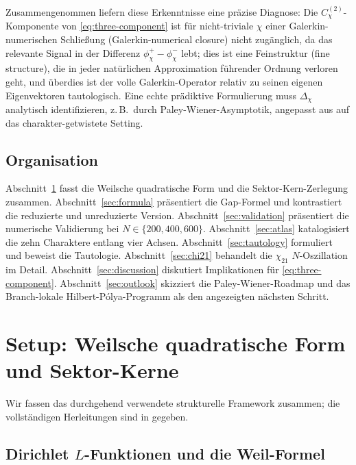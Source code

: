 \documentclass[10pt,twocolumn]{article}
\theoremstyle{definition}
\theoremstyle{remark}
\newcommand{\chifn}{\chi}
\newcommand{\Deltachi}{\Delta_{\chifn}}
\begin{document}
Zusammengenommen liefern diese Erkenntnisse eine präzise Diagnose: Die
$C^{(2)}_{\chifn}$-Komponente von \eqref{eq:three-component} ist für
nicht-triviale $\chi$ einer Galerkin-numerischen Schließung (Galerkin-numerical closure)
nicht zugänglich, da das relevante Signal in der Differenz
$\phi^+_{\chifn}-\phi^-_{\chifn}$ lebt; dies ist eine Feinstruktur (fine structure), die in
jeder natürlichen Approximation führender Ordnung verloren geht, und überdies ist der volle
Galerkin-Operator relativ zu seinen eigenen Eigenvektoren tautologisch.
Eine echte prädiktive Formulierung muss
$\Deltachi$ analytisch identifizieren, z.\,B.\ durch Paley-Wiener-Asymptotik,
angepasst aus \cite{RH_II} auf das charakter-getwistete Setting.

\subsection{Organisation}

Abschnitt~\ref{sec:setup} fasst die Weilsche quadratische Form und die
Sektor-Kern-Zerlegung zusammen. Abschnitt~\ref{sec:formula} präsentiert die
Gap-Formel und kontrastiert die reduzierte und unreduzierte Version.
Abschnitt~\ref{sec:validation} präsentiert die numerische Validierung bei
$N\in\{200,400,600\}$. Abschnitt~\ref{sec:atlas} katalogisiert die zehn
Charaktere entlang vier Achsen. Abschnitt~\ref{sec:tautology} formuliert
und beweist die Tautologie. Abschnitt~\ref{sec:chi21} behandelt die
$\chi_{21}$ $N$-Oszillation im Detail. Abschnitt~\ref{sec:discussion}
diskutiert Implikationen für \eqref{eq:three-component}. Abschnitt~\ref{sec:outlook}
skizziert die Paley-Wiener-Roadmap und das Branch-lokale
Hilbert-P\'olya-Programm als den angezeigten nächsten Schritt.

\section{Setup: Weilsche quadratische Form und Sektor-Kerne}
\label{sec:setup}

Wir fassen das durchgehend verwendete strukturelle Framework zusammen; die vollständigen
Herleitungen sind in \cite{AnalyticKernel} gegeben.

\subsection{\texorpdfstring{Dirichlet $L$-Funktionen}{Dirichlet L-Funktionen} und die Weil-Formel}
\end{document}

